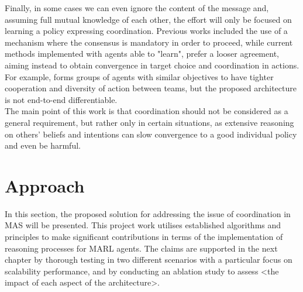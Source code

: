 \documentclass[a4paper,singleside,12pt]{report} %
\begin{document}
Finally, in some cases we can even ignore the content of the message and, assuming full mutual knowledge of each other, the effort will only be focused on learning a policy expressing coordination. Previous works \cite{Ren2005ConsensusSI, OlfatiSaber2007ConsensusAC} included the use of a mechanism where the consensus is mandatory in order to proceed, while current methods implemented with agents able to "learn", prefer a looser agreement, aiming instead to obtain convergence in target choice and coordination in actions. For example, \cite{Li2021StructuredDE} forms groups of agents with similar objectives to have tighter cooperation and diversity of action between teams, but the proposed architecture is not end-to-end differentiable.\\
The main point of this work is that coordination should not be considered as a general requirement, but rather only in certain situations, as extensive reasoning on others' beliefs and intentions can slow convergence to a good individual policy and even be harmful.

\chapter{Approach}\label{approach}

In this section, the proposed solution for addressing the issue of coordination in MAS will be presented. This project work utilises established algorithms and principles to make significant contributions in terms of the implementation of reasoning processes for MARL agents. The claims are supported in the next chapter by thorough testing in two different scenarios with a particular focus on scalability performance, and by conducting an ablation study to assess <the impact of each aspect of the architecture>.
\end{document}
